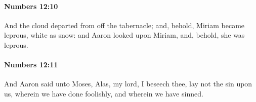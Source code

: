 		\paragraph{Numbers 12:10} %
			\label{NUMBERS-12-10}

			And the cloud departed from off the tabernacle; and, behold, Miriam became leprous, white as snow: and Aaron looked upon Miriam, and, behold, she was leprous.


		\paragraph{Numbers 12:11} %
			\label{NUMBERS-12-11}

			And Aaron said unto Moses, Alas, my lord, I beseech thee, lay not the sin upon us, wherein we have done foolishly, and wherein we have sinned.


